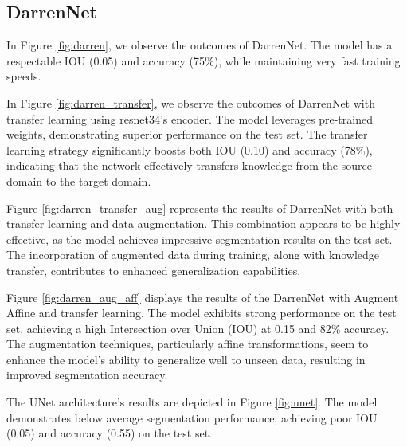 \subsection*{DarrenNet}

In Figure \ref{fig:darren}, we observe the outcomes of DarrenNet. The model has a respectable IOU (0.05) and accuracy (75\%), while maintaining very fast training speeds.



In Figure \ref{fig:darren_transfer}, we observe the outcomes of DarrenNet with transfer learning using resnet34's encoder. The model leverages pre-trained weights, demonstrating superior performance on the test set. The transfer learning strategy significantly boosts both IOU (0.10) and accuracy (78\%), indicating that the network effectively transfers knowledge from the source domain to the target domain.



Figure \ref{fig:darren_transfer_aug} represents the results of DarrenNet with both transfer learning and data augmentation. This combination appears to be highly effective, as the model achieves impressive segmentation results on the test set. The incorporation of augmented data during training, along with knowledge transfer, contributes to enhanced generalization capabilities.


Figure \ref{fig:darren_aug_aff} displays the results of the DarrenNet with Augment Affine and transfer learning. The model exhibits strong performance on the test set, achieving a high Intersection over Union (IOU) at 0.15 and 82\% accuracy. The augmentation techniques, particularly affine transformations, seem to enhance the model's ability to generalize well to unseen data, resulting in improved segmentation accuracy.


The UNet architecture's results are depicted in Figure \ref{fig:unet}. The model demonstrates below average segmentation performance, achieving poor IOU (0.05) and accuracy (0.55) on the test set.
